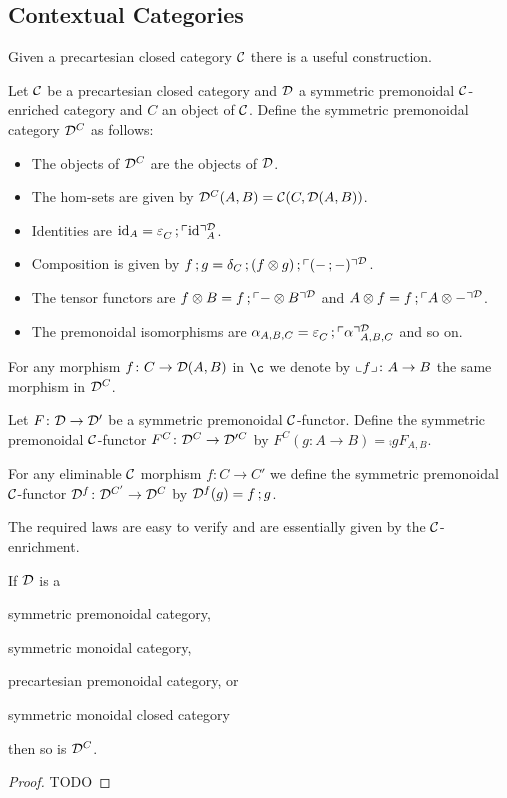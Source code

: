 \documentclass[runningheads,envcountsame]{llncs}
\begin{document}
\subsection{Contextual Categories}

Given a precartesian closed category $\mathcal{C}$ there is a useful construction.

\begin{definition}
    Let $\mathcal{C}$ be a precartesian closed category and $\mathcal{D}$ a symmetric premonoidal $\mathcal{C}$-enriched category and $C$ an object of $\mathcal{C}$. Define the symmetric premonoidal category $\mathcal{D}^C$ as follows:
    \begin{itemize}
        \item The objects of $\mathcal{D}^C$ are the objects of $\mathcal{D}$.
        \item The hom-sets are given by $\mathcal{D}^C(A, B) = \mathcal{C}(C, \mathcal{D}(A, B))$.
        \item Identities are $\id_A = \comp{\terminal_C}{\name[\D]{\id}_A}$.
        \item Composition is given by $\comp{f}{g} = \comp{\comp{\dup_C}{(\tensor{f}{g})}}{\name[\D]{(\comp{-}{-})}}$.
        \item The tensor functors are $\tensor{f}{B} = \comp{f}{\name[\D]{\tensor{-}{B}}}$ and $\tensor{A}{f} = \comp{f}{\name[\D]{\tensor{A}{-}}}$.
        \item The premonoidal isomorphisms are $\assoc_{A, B, C} = \comp{\terminal_C}{\name[\D]{\assoc}_{A,B,C}}$ and so on.
    \end{itemize}
    
    For any morphism $f\colon C \to \mathcal{D}(A, B)$ in $\c$ we denote by $\unname{f}\colon A \to B$ the same morphism in $\mathcal{D}^C$.

    Let $F\colon \mathcal{D} \to \mathcal{D}'$ be a symmetric premonoidal $\mathcal{C}$-functor. Define the symmetric premonoidal $\mathcal{C}$-functor $F^C\colon \mathcal{D}^C \to \mathcal{D}'^C$ by $F^C(g\colon A \to B) = \comp{g}{F_{A,B}}$.
    
    For any eliminable $\mathcal{C}$ morphism $f\colon C \to C'$ we define the symmetric premonoidal $\mathcal{C}$-functor $\mathcal{D}^f\colon \mathcal{D}^{C'} \to \mathcal{D}^C$ by $\D^f(g) = \comp{f}{g}$.
    
\end{definition}

The required laws are easy to verify and are essentially given by the $\mathcal{C}$-enrichment.

\begin{lemma}
    If $\mathcal{D}$ is a 
    \begin{lemmalist}
        \item symmetric premonoidal category,
        \item symmetric monoidal category,
        \item precartesian premonoidal category, or
        \item symmetric monoidal closed category
    \end{lemmalist}
    then so is $\mathcal{D}^C$.
\end{lemma}
\begin{proof}
    TODO
\end{proof}
\end{document}
